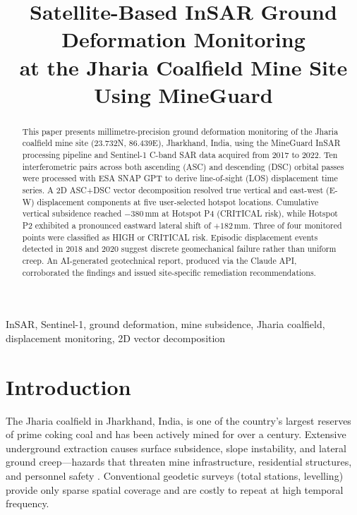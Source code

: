 \documentclass[conference]{IEEEtran}
\begin{document}
\title{Satellite-Based InSAR Ground Deformation Monitoring\\
at the Jharia Coalfield Mine Site Using MineGuard}

\author{
}

\maketitle

\begin{abstract}
This paper presents millimetre-precision ground deformation monitoring of
the Jharia coalfield mine site (23.732\textdegree{}N, 86.439\textdegree{}E),
Jharkhand, India, using the MineGuard InSAR processing pipeline and
Sentinel-1 C-band SAR data acquired from 2017 to 2022.
Ten interferometric pairs across both ascending (ASC) and descending (DSC)
orbital passes were processed with ESA SNAP GPT to derive line-of-sight (LOS)
displacement time series. A 2D ASC+DSC vector decomposition resolved true
vertical and east-west (E-W) displacement components at five user-selected
hotspot locations.
Cumulative vertical subsidence reached \(-380\)\,mm at Hotspot P4 (CRITICAL
risk), while Hotspot P2 exhibited a pronounced eastward lateral shift of
\(+182\)\,mm.
Three of four monitored points were classified as HIGH or CRITICAL risk.
Episodic displacement events detected in 2018 and 2020 suggest discrete
geomechanical failure rather than uniform creep.
An AI-generated geotechnical report, produced via the Claude API, corroborated
the findings and issued site-specific remediation recommendations.
\end{abstract}

\begin{IEEEkeywords}
InSAR, Sentinel-1, ground deformation, mine subsidence, Jharia coalfield,
displacement monitoring, 2D vector decomposition
\end{IEEEkeywords}

\section{Introduction}
The Jharia coalfield in Jharkhand, India, is one of the country's largest
reserves of prime coking coal and has been actively mined for over a century.
Extensive underground extraction causes surface subsidence, slope instability,
and lateral ground creep---hazards that threaten mine infrastructure,
residential structures, and personnel safety \cite{singh2018}.
Conventional geodetic surveys (total stations, levelling) provide only sparse
spatial coverage and are costly to repeat at high temporal frequency.
\end{document}
